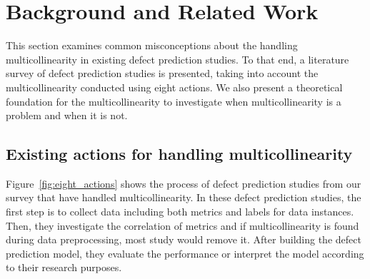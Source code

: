 \chapter{Background and Related Work}
\thispagestyle{fancy}
\label{sec:background}
\bigskip This section examines common misconceptions about the handling multicollinearity in existing defect prediction studies. To that end, a literature survey of defect prediction studies is presented, taking into account the multicollinearity conducted using eight actions. We also present a theoretical foundation for the multicollinearity to investigate when multicollinearity is a problem and when it is not.

\section{ Existing actions for handling multicollinearity}
\label{eightactions}
Figure~\ref{fig:eight_actions} shows the process of defect prediction studies from our survey that have handled multicollinearity. 
In these defect prediction studies, the first step is to collect data including both metrics and labels for data instances. 
Then, they investigate the correlation of metrics and if multicollinearity is found during data preprocessing, most study would remove it. 
After building the defect prediction model, they evaluate the performance or interpret the model according to their research purposes. 

